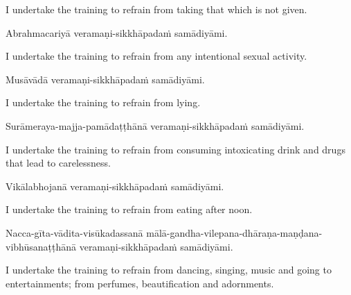 \begin{english-hang}
  I undertake the training to refrain from taking that which is not given.
\end{english-hang}

Abrahmacariyā veramaṇi-sikkhāpadaṁ samādiyāmi.

\begin{english-hang}
  I undertake the training to refrain from any intentional sexual activity.
\end{english-hang}

Musāvādā veramaṇi-sikkhāpadaṁ samādiyāmi.

\begin{english}
  I undertake the training to refrain from lying.
\end{english}

\begin{pali-hang}
Surāmeraya-majja-pamādaṭṭhānā veramaṇi-sikkhāpadaṁ samādiyāmi.
\end{pali-hang}

\begin{english-hang}
  I undertake the training to refrain from consuming intoxicating drink and drugs that\hyperlink{endnote138-appendix}{\hypertarget{endnote138-body}{}}
  lead to carelessness.
\end{english-hang}

Vikālabhojanā veramaṇi-sikkhāpadaṁ samādiyāmi.

\begin{english}
  I undertake the training to refrain from eating after noon.\hyperlink{endnote139-appendix}{\hypertarget{endnote139-body}{}}
  \end{english}

\begin{pali-hang}
Nacca-gīta-vādita-visūkadassanā mālā-gandha-vilepana-dhāraṇa-maṇḍana-vibhūsanaṭṭhānā veramaṇi-sikkhāpadaṁ samādiyāmi.
\end{pali-hang}

\begin{english-hang}
  I undertake the training to refrain from dancing, singing, music and going to entertainments; from perfumes, beautification and adornments.\hyperlink{endnote140-appendix}{\hypertarget{endnote140-body}{}}
  \end{english-hang}

